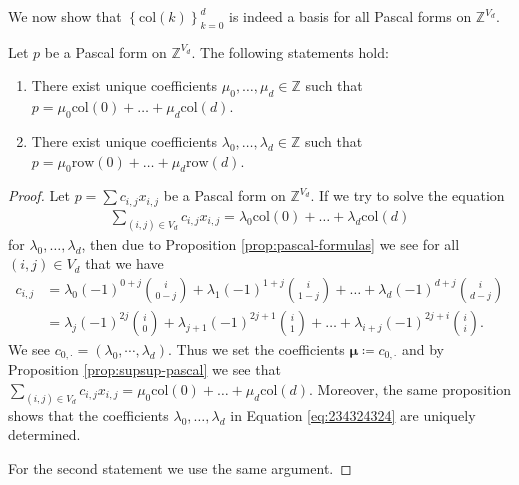 We now show that \( \left\{ \mathrm{col}(k) \right\}_{k=0}^{d} \) is indeed a basis for all Pascal forms on \( \mathbb{Z}^{V_d} \).

\begin{proposition}\label{prop:pascal-basis}
    Let \( p \) be a Pascal form on \( \mathbb Z^{V_d} \). The following statements hold:
    \begin{enumerate}
        \item There exist unique coefficients \( \mu_0, \dots, \mu_d \in \mathbb{Z} \) such that 
        \( p = \mu_0 \mathrm{col}(0) + \dots + \mu_d \mathrm{col}(d) \).

        \item There exist unique coefficients \( \lambda_0, \dots, \lambda_d \in \mathbb{Z} \) such that 
        \( p = \mu_0 \mathrm{row}(0) + \dots + \mu_d \mathrm{row}(d) \).
    \end{enumerate}
\end{proposition}

\begin{proof}
    Let \( p = \sum c_{i,j}x_{i,j}\) be a Pascal form on \( \mathbb{Z}^{V_d} \). If we try to solve the equation
    \begin{align}\label{eq:234324324}
        \sum_{(i,j) \in V_d} c_{i,j}x_{i,j} = \lambda_0 \mathrm{col}(0) + \dots + \lambda_d \mathrm{col}(d)
    \end{align}
    for \( \lambda_0, \dots, \lambda_d \), then due to Proposition \ref{prop:pascal-formulas} we see for all \( (i,j)\in V_d \) that we have
    \begin{align*}
        c_{i,j} &= \lambda_0 (-1)^{0+j} \binom{i}{0-j} + \lambda_1 (-1)^{1+j} \binom{i}{1-j} + \dots + \lambda_d (-1)^{d+j} \binom{i}{d-j} \\
        &= \lambda_j (-1)^{2j} \binom{i}{0} + \lambda_{j+1} (-1)^{2j+1} \binom{i}{1} + \dots + \lambda_{i+j} (-1)^{2j+i} \binom{i}{i}.
    \end{align*}
    We see \(c_{0, \cdot} = (\lambda_0, \cdots, \lambda_d) \). Thus we set the coefficients \( \boldsymbol \mu \coloneqq c_{0, \cdot} \) and by Proposition \ref{prop:supsup-pascal} we see that \( \sum_{(i,j) \in V_d} c_{i,j}x_{i,j} = \mu_0 \mathrm{col}(0) + \dots + \mu_d \mathrm{col}(d) \). Moreover, the same proposition shows that the coefficients \( \lambda_0, \dots, \lambda_d \) in Equation \ref{eq:234324324} are uniquely determined. 
    
    For the second statement we use the same argument.
\end{proof}


